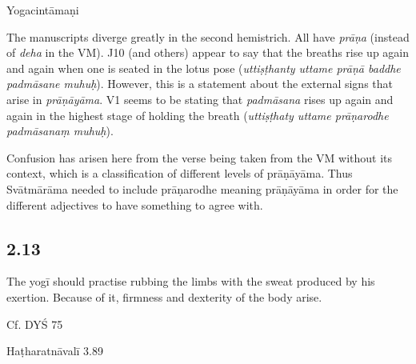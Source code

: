 \begin{ekdosis}
\begin{testimonia}[hp02_012]
Yogacintāmaṇi

\begin{versinnote}
\end{versinnote}
\end{testimonia}

\begin{philcomm}[hp02_012]
The manuscripts diverge greatly in the second hemistrich. All have \emph{prāṇa} (instead of \emph{deha} in the VM). J10 (and others) appear to say that the breaths rise up again and again when one is seated in the lotus pose (\emph{uttiṣṭhanty uttame prāṇā baddhe padmāsane muhuḥ}). However, this is a statement about the external signs that arise in \emph{prāṇāyāma}. V1 seems to be stating that \emph{padmāsana} rises up again and again in the highest stage of holding the breath (\emph{uttiṣṭhaty uttame prāṇarodhe padmāsanaṃ muhuḥ}).

Confusion has arisen here from the verse being taken from the VM without its context, which is a classification of different levels of prāṇāyāma. Thus Svātmārāma needed to include prāṇarodhe meaning prāṇāyāma in order for the different adjectives to have something to agree with.
\end{philcomm}

\subsection*{2.13}
\begin{translation}[hp02_013]
The yogī should practise rubbing the limbs with the sweat produced by his exertion. Because of it, firmness and dexterity of the body arise.
\end{translation}

\begin{sources}[hp02_013]
Cf. DYŚ 75

\begin{versinnote}
\end{versinnote}
\end{sources}

\begin{testimonia}[hp02_013]
Haṭharatnāvalī 3.89


\end{testimonia}
\end{ekdosis}

